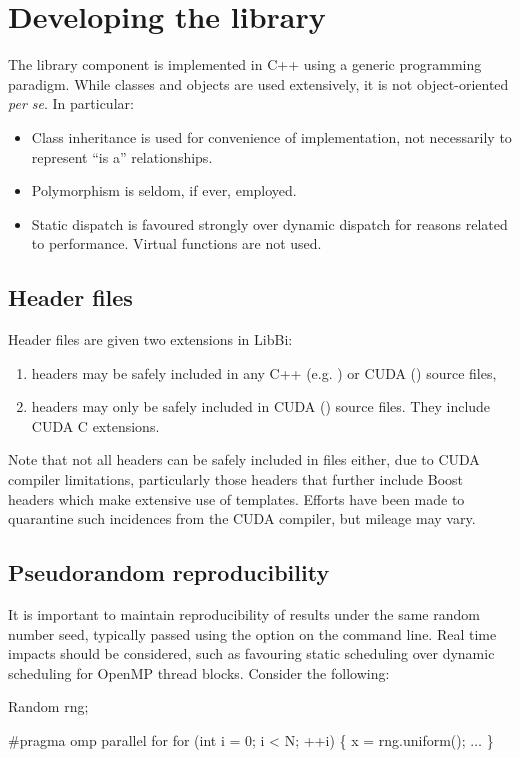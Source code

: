 \section{Developing the library}

The library component is implemented in C++ using a generic programming
paradigm. While classes and objects are used extensively, it is not
object-oriented \textsl{per se}. In particular:
\begin{itemize}
\item Class inheritance is used for convenience of implementation, not
  necessarily to represent ``is a'' relationships.
\item Polymorphism is seldom, if ever, employed.
\item Static dispatch is favoured strongly over dynamic dispatch for
  reasons related to performance. Virtual functions are not used.
\end{itemize}

\subsection{Header files}

Header files are given two extensions in LibBi:
\begin{enumerate}
\item {} headers may be safely included in any C++ (e.g.
) or CUDA () source files,
\item {} headers may only be safely included in CUDA ()
source files. They include CUDA C extensions.
\end{enumerate}

Note that not all  headers can be safely included in 
files either, due to CUDA compiler limitations, particularly those headers
that further include Boost headers which make extensive use of
templates. Efforts have been made to quarantine such incidences from the CUDA
compiler, but mileage may vary.

\subsection{Pseudorandom reproducibility\label{Pseudorandom_reproducibility}}

It is important to maintain reproducibility of results under the same random
number seed, typically passed using the
 option on the command line. Real time impacts should be
considered, such as favouring static scheduling over
dynamic scheduling for OpenMP thread
blocks. Consider the following:
\begin{cppcode}
Random rng;

#pragma omp parallel for
for (int i = 0; i < N; ++i) \{
  x = rng.uniform();
  \(\ldots\)
\}
\end{cppcode}

